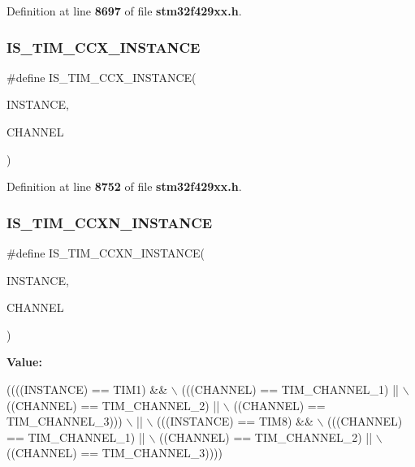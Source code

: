 Definition at line \textbf{ 8697} of file \textbf{ stm32f429xx.\+h}.

\mbox{\label{group__Exported__macros_ga6517a51ea79512a42bc53c718a77f18e}} 
\subsubsection{I\+S\+\_\+\+T\+I\+M\+\_\+\+C\+C\+X\+\_\+\+I\+N\+S\+T\+A\+N\+CE}
{\footnotesize\ttfamily \#define I\+S\+\_\+\+T\+I\+M\+\_\+\+C\+C\+X\+\_\+\+I\+N\+S\+T\+A\+N\+CE(\begin{DoxyParamCaption}\item[{}]{I\+N\+S\+T\+A\+N\+CE,  }\item[{}]{C\+H\+A\+N\+N\+EL }\end{DoxyParamCaption})}



Definition at line \textbf{ 8752} of file \textbf{ stm32f429xx.\+h}.

\mbox{\label{group__Exported__macros_ga7181cfd1649c4e65e24b7c863e94a54f}} 
\subsubsection{I\+S\+\_\+\+T\+I\+M\+\_\+\+C\+C\+X\+N\+\_\+\+I\+N\+S\+T\+A\+N\+CE}
{\footnotesize\ttfamily \#define I\+S\+\_\+\+T\+I\+M\+\_\+\+C\+C\+X\+N\+\_\+\+I\+N\+S\+T\+A\+N\+CE(\begin{DoxyParamCaption}\item[{}]{I\+N\+S\+T\+A\+N\+CE,  }\item[{}]{C\+H\+A\+N\+N\+EL }\end{DoxyParamCaption})}

{\bfseries Value\+:}
\begin{DoxyCode}
((((INSTANCE) == TIM1) &&                    \(\backslash\)
     (((CHANNEL) == TIM\_CHANNEL\_1) ||           \(\backslash\)
      ((CHANNEL) == TIM\_CHANNEL\_2) ||           \(\backslash\)
      ((CHANNEL) == TIM\_CHANNEL\_3)))            \(\backslash\)
    ||                                          \(\backslash\)
    (((INSTANCE) == TIM8) &&                    \(\backslash\)
     (((CHANNEL) == TIM\_CHANNEL\_1) ||           \(\backslash\)
      ((CHANNEL) == TIM\_CHANNEL\_2) ||           \(\backslash\)
      ((CHANNEL) == TIM\_CHANNEL\_3))))
\end{DoxyCode}


